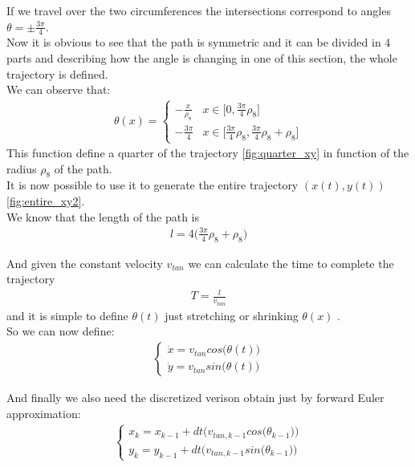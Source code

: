 If we travel over the two circumferences the intersections correspond to angles $\theta = \pm \frac{3\pi}{4}$. \\
Now it is obvious to see that the path is symmetric and it can be divided in 4 parts and describing how the angle is changing in one of this section, the whole trajectory is defined.\\
We can observe that:
\begin{align}
\theta(x) =
\begin{cases}
    -\frac{x}{\rho_{8}}  &x\in \Big[0,\frac{3\pi}{4}\rho_{8}\Big] \quad \quad \ \ \  \\[10pt]
    -\frac{3\pi}{4} &x\in \Big[\frac{3\pi}{4}\rho_{8} ,\frac{3\pi}{4}\rho_{8} + \rho_{8}\Big]
\end{cases}
\end{align}
This function define a quarter of the trajectory \ref{fig:quarter_xy} in function of the radius $\rho_{8}$ of the path.\\
It is now possible to use it to generate the entire trajectory $( x(t) , y(t) )$ \ref{fig:entire_xy2}.\\
We know that the length of the path is 
\begin{align*}
l = 4\Big(\frac{3\pi}{4}\rho_{8} + \rho_{8}\Big)
\end{align*}

And given the constant velocity $v_{tan}$ we can calculate the time to complete the trajectory 
\begin{align*}
T = \frac{l}{v_{tan}}
\end{align*}
and it is simple to define $\theta(t)$ just stretching or shrinking $\theta(x)$ .\\

So we can now define:
\begin{align}
\begin{cases}
\dot{x} = v_{tan} cos\big(\theta(t)\big) \\[10pt]
\dot{y} = v_{tan} sin\big(\theta(t)\big)
\end{cases}
\end{align}

And finally we also need the discretized verison obtain just by forward Euler approximation:
\begin{align}
\begin{cases}
x_k = x_{k-1} + dt \Big(v_{tan,k-1} cos\big(\theta_{k-1}\big)\Big) \\[10pt]
y_k = y_{k-1} + dt \Big(v_{tan,k-1} sin\big(\theta_{k-1}\big)\Big)
\end{cases}
\end{align}

